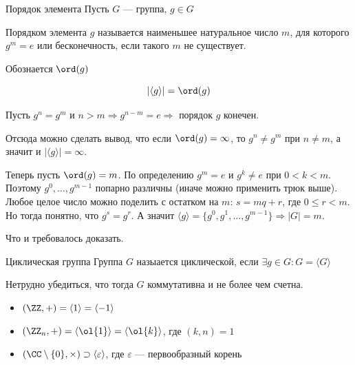 \begin{defn}{Порядок элемента}{}
    Пусть \( G \) --- группа, \( g \in G \)

    Порядком элемента \( g \) называется наименьшее натуральное число \( m \),
    для которого \( g^m = e \) или бесконечность, если такого \( m \) не существует.

    Обознается \( \ord (g) \)
\end{defn}

\begin{prop}{}{}
    \[
        | \langle g \rangle | = \ord (g)
    \]
\end{prop}

Пусть \( g^n = g^m \) и \( n > m \Rightarrow g^{n - m} = e \Rightarrow \) порядок \( g \) конечен.

Отсюда можно сделать вывод, что если \( \ord (g) = \infty \), то \( g^n \neq g^m \) при \( n \neq m \),
а значит и \( | \langle g \rangle | = \infty \).

Теперь пусть \( \ord (g) = m \).
По определению \( g^m = e \) и \( g^k \neq e \) при \( 0 < k < m \).
Поэтому \( g^0, \ldots, g^{m - 1} \) попарно различны (иначе можно применить трюк выше).
Любое целое число можно поделить с остатком на \( m \): \( s = mq + r \), где \( 0 \leq r < m \).
Но тогда понятно, что \( g^s = g^r \).
А значит \( \langle g \rangle = \{ g^0, g^1, \ldots, g^{m - 1} \} \Rightarrow |G| = m \).

Что и требовалось доказать.

\begin{defn}{Циклическая группа}{}
    Группа \( G \) назыается циклической, если \( \exists g \in G : G = \langle G \rangle \)
\end{defn}

\begin{remark}{}{}
    Нетрудно убедиться, что тогда \( G \) коммутативна и не более чем счетна.
\end{remark}

\begin{example}{}{}
    \begin{itemize}
        \item
            \( (\ZZ, +) = \langle 1 \rangle = \langle -1 \rangle \)
        \item
            \( (\ZZ_n, +) = \langle \ol{1} \rangle = \langle \ol{k} \rangle \), где \( (k, n) = 1 \)
        \item
            \( (\CC \setminus \{ 0 \}, \times) \supset \langle \varepsilon \rangle \),
            где \( \varepsilon \) --- первообразный корень
    \end{itemize}
\end{example}

